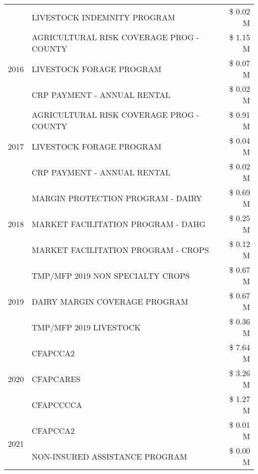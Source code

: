 \begin{tabular}{llr}
 & LIVESTOCK INDEMNITY PROGRAM & \$ 0.02 M \\
\cline{1-3}
\multirow[t]{3}{*}{2016} & AGRICULTURAL RISK COVERAGE PROG - COUNTY & \$ 1.15 M \\
 & LIVESTOCK FORAGE PROGRAM & \$ 0.07 M \\
 & CRP PAYMENT - ANNUAL RENTAL & \$ 0.02 M \\
\cline{1-3}
\multirow[t]{3}{*}{2017} & AGRICULTURAL RISK COVERAGE PROG - COUNTY & \$ 0.91 M \\
 & LIVESTOCK FORAGE PROGRAM & \$ 0.04 M \\
 & CRP PAYMENT - ANNUAL RENTAL & \$ 0.02 M \\
\cline{1-3}
\multirow[t]{3}{*}{2018} & MARGIN PROTECTION PROGRAM - DAIRY & \$ 0.69 M \\
 & MARKET FACILITATION PROGRAM - DAHG & \$ 0.25 M \\
 & MARKET FACILITATION PROGRAM - CROPS & \$ 0.12 M \\
\cline{1-3}
\multirow[t]{3}{*}{2019} & TMP/MFP 2019 NON SPECIALTY CROPS & \$ 0.67 M \\
 & DAIRY MARGIN COVERAGE PROGRAM & \$ 0.67 M \\
 & TMP/MFP 2019 LIVESTOCK & \$ 0.36 M \\
\cline{1-3}
\multirow[t]{3}{*}{2020} & CFAPCCA2 & \$ 7.64 M \\
 & CFAPCARES & \$ 3.26 M \\
 & CFAPCCCCA & \$ 1.27 M \\
\cline{1-3}
\multirow[t]{2}{*}{2021} & CFAPCCA2 & \$ 0.01 M \\
 & NON-INSURED ASSISTANCE PROGRAM & \$ 0.00 M \\
\cline{1-3}
\bottomrule
\end{tabular}
